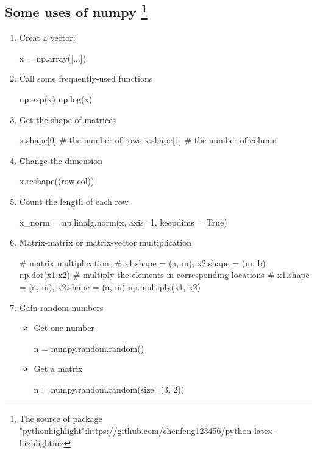 \documentclass{article}
\begin{document}
\subsection{Some uses of numpy \protect\footnote{The source of package "pythonhighlight":https://github.com/chenfeng123456/python-latex-highlighting}}
\begin{enumerate}
\item Creat a vector:
\begin{python}
x = np.array([...])
\end{python}

\item Call some frequently-used functions
\begin{python}
np.exp(x)
np.log(x)
\end{python}

\item Get the shape of matrices
\begin{python}[language=Python]
x.shape[0] # the number of rows
x.shape[1] # the number of column
\end{python}

\item Change the dimension
\begin{python}
x.reshape((row,col))
\end{python}

\item Count the length of each row
\begin{python}
x_norm = np.linalg.norm(x, axis=1, keepdims = True)
\end{python}

\item Matrix-matrix or matrix-vector multiplication
\begin{python}
# matrix multiplication: 
# x1.shape = (a, m), x2.shape = (m, b)
np.dot(x1,x2) 
# multiply the elements in corresponding locations
# x1.shape = (a, m), x2.shape = (a, m)
np.multiply(x1, x2) 
\end{python}

\item Gain random numbers

\begin{itemize}

\item Get one number
\begin{python}
n = numpy.random.random()
\end{python}

\item Get a matrix
\begin{python}
n = numpy.random.random(size=(3, 2))
\end{python}


\end{itemize}
\end{enumerate}
\end{document}
